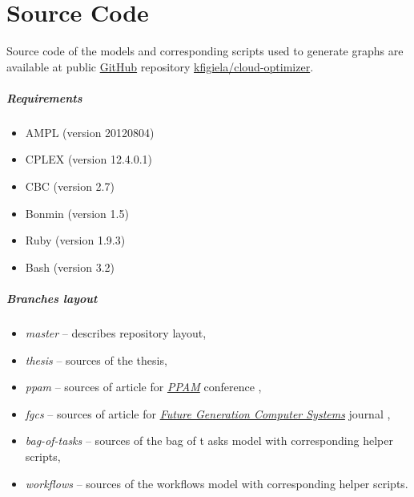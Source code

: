 \chapter{Source Code} %

\label{AppendixA}

Source code of the models and corresponding scripts used to generate graphs are available at public \href{https://github.com}{GitHub} repository \href{https://github.com/kfigiela/cloud-optimizer}{kfigiela/cloud-optimizer}. 

\paragraph{Requirements}

\begin{itemize}
  \item AMPL (version 20120804)
  \item CPLEX (version 12.4.0.1)
  \item CBC (version 2.7)
  \item Bonmin (version 1.5)
  \item Ruby (version 1.9.3)
  \item Bash (version 3.2)
\end{itemize}

\paragraph{Branches layout}

\begin{itemize}
  \item \emph{master} -- describes repository layout,
  \item \emph{thesis} -- sources of the thesis, 
  \item \emph{ppam} -- sources of article for \emph{\href{http://ppam.pl}{PPAM}} conference ,
  \item \emph{fgcs} -- sources of article for \emph{\href{http://www.journals.elsevier.com/future-generation-computer-systems/}{Future Generation Computer Systems}}  journal ,
  \item \emph{bag-of-tasks} -- sources of the bag of t  asks model with corresponding helper scripts,
  \item \emph{workflows} -- sources of the workflows model with corresponding helper scripts.
\end{itemize}
